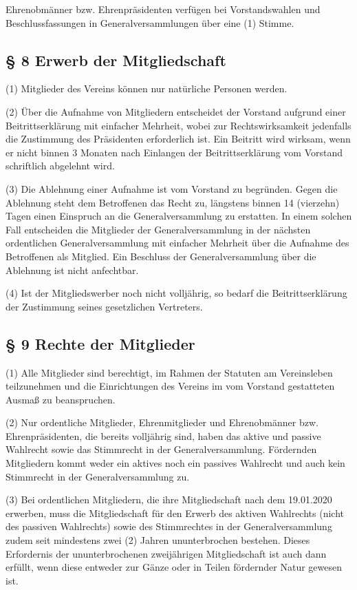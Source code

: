 \documentclass[11pt,a4paper]{article}
\begin{document}
Ehrenobmänner bzw. Ehrenpräsidenten verfügen bei Vorstandswahlen und Beschlussfassungen in Generalversammlungen über eine (1) Stimme.

\subsection{§ 8
Erwerb der Mitgliedschaft}

(1)
Mitglieder des Vereins können nur natürliche Personen werden.

(2)
Über die Aufnahme von Mitgliedern entscheidet der Vorstand aufgrund einer Beitrittserklärung mit einfacher Mehrheit, wobei zur Rechtswirksamkeit jedenfalls die Zustimmung des Präsidenten erforderlich ist.
Ein Beitritt wird wirksam, wenn er nicht binnen 3 Monaten nach Einlangen der Beitrittserklärung vom Vorstand schriftlich abgelehnt wird.

(3)
Die Ablehnung einer Aufnahme ist vom Vorstand zu begründen.
Gegen die Ablehnung steht dem Betroffenen das Recht zu, längstens binnen 14 (vierzehn) Tagen einen Einspruch an die Generalversammlung zu erstatten.
In einem solchen Fall entscheiden die Mitglieder der Generalversammlung in der nächsten ordentlichen Generalversammlung mit einfacher Mehrheit über die Aufnahme des Betroffenen als Mitglied.
Ein Beschluss der Generalversammlung über die Ablehnung ist nicht anfechtbar.

(4)
Ist der Mitgliedswerber noch nicht volljährig, so bedarf die Beitrittserklärung der Zustimmung seines gesetzlichen Vertreters.

\subsection{§ 9
Rechte der Mitglieder}

(1)
Alle Mitglieder sind berechtigt, im Rahmen der Statuten am Vereinsleben teilzunehmen und die Einrichtungen des Vereins im vom Vorstand gestatteten Ausmaß zu beanspruchen.

(2)
Nur ordentliche Mitglieder, Ehrenmitglieder und Ehrenobmänner bzw. Ehrenpräsidenten, die bereits volljährig sind, haben das aktive und passive Wahlrecht sowie das Stimmrecht in der Generalversammlung.
Fördernden Mitgliedern kommt weder ein aktives noch ein passives Wahlrecht und auch kein Stimmrecht in der Generalversammlung zu.

(3)
Bei ordentlichen Mitgliedern, die ihre Mitgliedschaft nach dem 19.01.2020 erwerben, muss die Mitgliedschaft für den Erwerb des aktiven Wahlrechts (nicht des passiven Wahlrechts) sowie des Stimmrechtes in der Generalversammlung zudem seit mindestens zwei (2) Jahren ununterbrochen bestehen.
Dieses Erfordernis der ununterbrochenen zweijährigen Mitgliedschaft ist auch dann erfüllt, wenn diese entweder zur Gänze oder in Teilen fördernder Natur gewesen ist.
\end{document}
